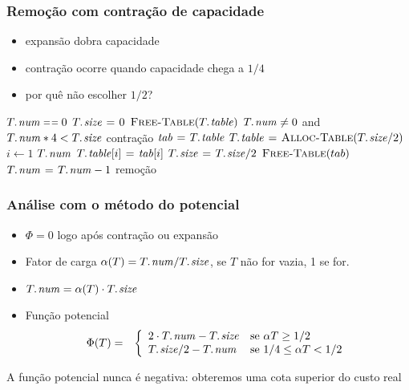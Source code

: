 \documentclass{beamer}
\begin{document}
\begin{frame}

\frametitle{Remoção com contração de capacidade}

\begin{itemize}
\item expansão dobra capacidade
\item contração ocorre quando capacidade chega a $1/4$ 
\item por quê não escolher $1/2$?
\end{itemize}

\begin{codebox}
\li \If $\attrib{T}{num} \isequal 0$ \Then
\li   $\attrib{T}{size} \gets 0$
\li   $\proc{Free-Table}(\attrib{T}{table})$
\li \ElseIf $\attrib{T}{num} \neq 0$ and $\attrib{T}{num} * 4 < \attrib{T}{size}$ \Comment contração
\li \Then $\id{tab} \gets \attrib{T}{table}$
\li   $\attrib{T}{table} \gets \proc{Alloc-Table}(\attrib{T}{size} / 2)$
\li   \For $i \gets 1$ \To $\attrib{T}{num}$
\li   \Do $\attrib{T}{table}[i] \gets \id{tab}[i]$
      \End
\li   $\attrib{T}{size} \gets \attrib{T}{size} / 2$
\li   $\textnormal{\scshape Free-Table}(tab)$
    \End
\li $\attrib{T}{num} \gets \attrib{T}{num}-1$ \Comment remoção
\end{codebox}

\end{frame}

\begin{frame}
\frametitle{Análise com o método do potencial}

\begin{itemize}
\item $\Phi = 0$ logo após contração ou expansão
\item Fator de carga $\alpha(T) = \attrib{T}{num} / \attrib{T}{size}$, se $T$ não for vazia, 1 se for.
\item $\attrib{T}{num} = \alpha(T) \cdot \attrib{T}{size}$
\item Função potencial
\begin{eqnarray*}
\Phi(T) & = & \left\{ \begin{array}{ll}
2 \cdot \attrib{T}{num} - \attrib{T}{size} & \text{se } \alpha{T} \ge 1/2 \\
\attrib{T}{size}/2 - \attrib{T}{num} & \text{se } 1/4 \le \alpha{T} < 1/2 \\
\end{array}
\right.
\end{eqnarray*}
\end{itemize}
A função potencial nunca é negativa: obteremos uma cota superior do custo real
\end{frame}
\end{document}
